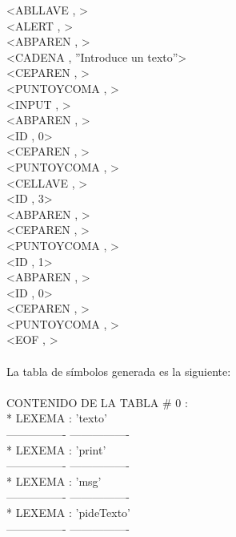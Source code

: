 \documentclass{article}
\begin{document}
\begin{flushleft}
<ABLLAVE , >\\
<ALERT , >\\
<ABPAREN , >\\
<CADENA , ''Introduce un texto''>\\
<CEPAREN , >\\
<PUNTOYCOMA , >\\
<INPUT , >\\
<ABPAREN , >\\
<ID , 0>\\
<CEPAREN , >\\
<PUNTOYCOMA , >\\
<CELLAVE , >\\
<ID , 3>\\
<ABPAREN , >\\
<CEPAREN , >\\
<PUNTOYCOMA , >\\
<ID , 1>\\
<ABPAREN , >\\
<ID , 0>\\
<CEPAREN , >\\
<PUNTOYCOMA , >\\
<EOF , >\\
\quad\\
La tabla de símbolos generada es la siguiente:\\
\quad\\
CONTENIDO DE LA TABLA \# 0 :\\

*	LEXEMA : 'texto'\\
---------------- ----------------\\

*	LEXEMA : 'print'\\
---------------- ----------------\\

*	LEXEMA : 'msg'\\
---------------- ----------------\\

*	LEXEMA : 'pideTexto'\\
---------------- ----------------\\
\end{flushleft}
\end{document}
